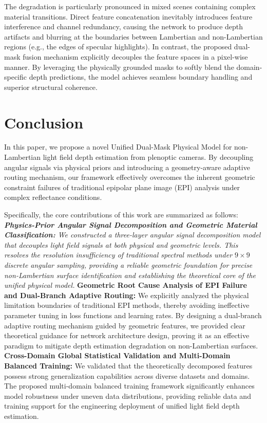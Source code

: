 \documentclass[lettersize,journal]{IEEEtran}
\begin{document}
The degradation is particularly pronounced in mixed scenes containing complex material transitions. Direct feature concatenation inevitably introduces feature interference and channel redundancy, causing the network to produce depth artifacts and blurring at the boundaries between Lambertian and non-Lambertian regions (e.g., the edges of specular highlights). In contrast, the proposed dual-mask fusion mechanism explicitly decouples the feature spaces in a pixel-wise manner. By leveraging the physically grounded masks to softly blend the domain-specific depth predictions, the model achieves seamless boundary handling and superior structural coherence.


\section{Conclusion}


In this paper, we propose a novel Unified Dual-Mask Physical Model for non-Lambertian light field depth estimation from plenoptic cameras. By decoupling angular signals via physical priors and introducing a geometry-aware adaptive routing mechanism, our framework effectively overcomes the inherent geometric constraint failures of traditional epipolar plane image (EPI) analysis under complex reflectance conditions. 

Specifically, the core contributions of this work are summarized as follows:
\textit{ \textbf{Physics-Prior Angular Signal Decomposition and Geometric Material Classification:} We constructed a three-layer angular signal decomposition model that decouples light field signals at both physical and geometric levels. This resolves the resolution insufficiency of traditional spectral methods under $9 \times 9$ discrete angular sampling, providing a reliable geometric foundation for precise non-Lambertian surface identification and establishing the theoretical core of the unified physical model.
} \textbf{Geometric Root Cause Analysis of EPI Failure and Dual-Branch Adaptive Routing:} We explicitly analyzed the physical limitation boundaries of traditional EPI methods, thereby avoiding ineffective parameter tuning in loss functions and learning rates. By designing a dual-branch adaptive routing mechanism guided by geometric features, we provided clear theoretical guidance for network architecture design, proving it as an effective paradigm to mitigate depth estimation degradation on non-Lambertian surfaces.
\textbf{Cross-Domain Global Statistical Validation and Multi-Domain Balanced Training:} We validated that the theoretically decomposed features possess strong generalization capabilities across diverse datasets and domains. The proposed multi-domain balanced training framework significantly enhances model robustness under uneven data distributions, providing reliable data and training support for the engineering deployment of unified light field depth estimation.
\end{document}
